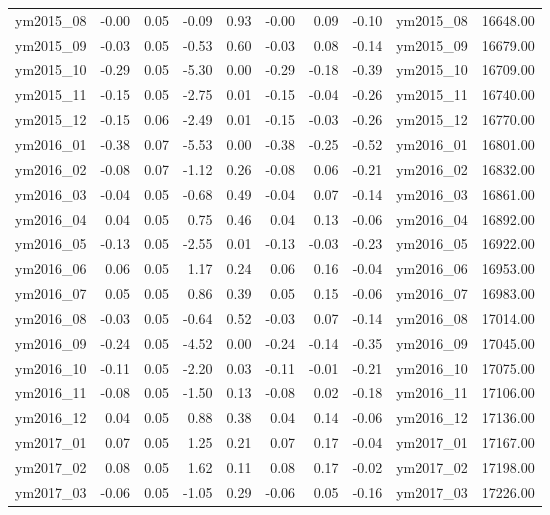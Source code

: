 \begin{table}[ht]
\begin{tabular}{rrrrrrrrlr}
  ym2015\_08 & -0.00 & 0.05 & -0.09 & 0.93 & -0.00 & 0.09 & -0.10 & ym2015\_08 & 16648.00 \\ 
  ym2015\_09 & -0.03 & 0.05 & -0.53 & 0.60 & -0.03 & 0.08 & -0.14 & ym2015\_09 & 16679.00 \\ 
  ym2015\_10 & -0.29 & 0.05 & -5.30 & 0.00 & -0.29 & -0.18 & -0.39 & ym2015\_10 & 16709.00 \\ 
  ym2015\_11 & -0.15 & 0.05 & -2.75 & 0.01 & -0.15 & -0.04 & -0.26 & ym2015\_11 & 16740.00 \\ 
  ym2015\_12 & -0.15 & 0.06 & -2.49 & 0.01 & -0.15 & -0.03 & -0.26 & ym2015\_12 & 16770.00 \\ 
  ym2016\_01 & -0.38 & 0.07 & -5.53 & 0.00 & -0.38 & -0.25 & -0.52 & ym2016\_01 & 16801.00 \\ 
  ym2016\_02 & -0.08 & 0.07 & -1.12 & 0.26 & -0.08 & 0.06 & -0.21 & ym2016\_02 & 16832.00 \\ 
  ym2016\_03 & -0.04 & 0.05 & -0.68 & 0.49 & -0.04 & 0.07 & -0.14 & ym2016\_03 & 16861.00 \\ 
  ym2016\_04 & 0.04 & 0.05 & 0.75 & 0.46 & 0.04 & 0.13 & -0.06 & ym2016\_04 & 16892.00 \\ 
  ym2016\_05 & -0.13 & 0.05 & -2.55 & 0.01 & -0.13 & -0.03 & -0.23 & ym2016\_05 & 16922.00 \\ 
  ym2016\_06 & 0.06 & 0.05 & 1.17 & 0.24 & 0.06 & 0.16 & -0.04 & ym2016\_06 & 16953.00 \\ 
  ym2016\_07 & 0.05 & 0.05 & 0.86 & 0.39 & 0.05 & 0.15 & -0.06 & ym2016\_07 & 16983.00 \\ 
  ym2016\_08 & -0.03 & 0.05 & -0.64 & 0.52 & -0.03 & 0.07 & -0.14 & ym2016\_08 & 17014.00 \\ 
  ym2016\_09 & -0.24 & 0.05 & -4.52 & 0.00 & -0.24 & -0.14 & -0.35 & ym2016\_09 & 17045.00 \\ 
  ym2016\_10 & -0.11 & 0.05 & -2.20 & 0.03 & -0.11 & -0.01 & -0.21 & ym2016\_10 & 17075.00 \\ 
  ym2016\_11 & -0.08 & 0.05 & -1.50 & 0.13 & -0.08 & 0.02 & -0.18 & ym2016\_11 & 17106.00 \\ 
  ym2016\_12 & 0.04 & 0.05 & 0.88 & 0.38 & 0.04 & 0.14 & -0.06 & ym2016\_12 & 17136.00 \\ 
  ym2017\_01 & 0.07 & 0.05 & 1.25 & 0.21 & 0.07 & 0.17 & -0.04 & ym2017\_01 & 17167.00 \\ 
  ym2017\_02 & 0.08 & 0.05 & 1.62 & 0.11 & 0.08 & 0.17 & -0.02 & ym2017\_02 & 17198.00 \\ 
  ym2017\_03 & -0.06 & 0.05 & -1.05 & 0.29 & -0.06 & 0.05 & -0.16 & ym2017\_03 & 17226.00 \\ 

\end{tabular}
\end{table}
